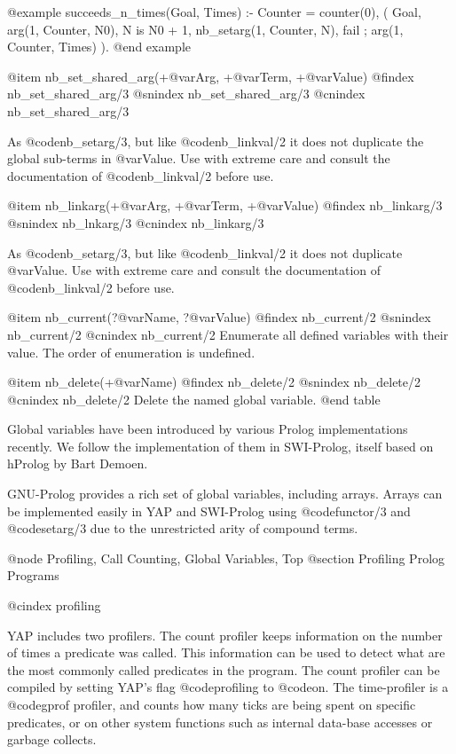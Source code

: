 {{{{{{{@example
    succeeds_n_times(Goal, Times) :-
            Counter = counter(0),
            (   Goal,
                arg(1, Counter, N0),
                N is N0 + 1,
                nb_setarg(1, Counter, N),
                fail
            ;   arg(1, Counter, Times)
            ).
@end example

@item nb_set_shared_arg(+@var{Arg}, +@var{Term}, +@var{Value}) 
@findex nb_set_shared_arg/3
@snindex nb_set_shared_arg/3
@cnindex nb_set_shared_arg/3

As @code{nb_setarg/3}, but like @code{nb_linkval/2} it does not
duplicate the global sub-terms in @var{Value}. Use with extreme care
and consult the documentation of @code{nb_linkval/2} before use.

@item nb_linkarg(+@var{Arg}, +@var{Term}, +@var{Value}) 
@findex nb_linkarg/3
@snindex nb_lnkarg/3
@cnindex nb_linkarg/3

As @code{nb_setarg/3}, but like @code{nb_linkval/2} it does not
duplicate @var{Value}. Use with extreme care and consult the
documentation of @code{nb_linkval/2} before use.


@item nb_current(?@var{Name}, ?@var{Value}) 
@findex nb_current/2
@snindex nb_current/2
@cnindex nb_current/2
Enumerate all defined variables with their value. The order of
enumeration is undefined. 

@item nb_delete(+@var{Name}) 
@findex nb_delete/2
@snindex nb_delete/2
@cnindex nb_delete/2
Delete the named global variable. 
@end table

Global variables have been introduced by various Prolog
implementations recently. We follow the implementation of them in
SWI-Prolog, itself based on hProlog by Bart Demoen.

GNU-Prolog provides a rich set of global variables, including
arrays. Arrays can be implemented easily in YAP and SWI-Prolog using
@code{functor/3} and @code{setarg/3} due to the unrestricted arity of
compound terms.


@node Profiling, Call Counting, Global Variables, Top
@section Profiling Prolog Programs

@cindex profiling

YAP includes two profilers. The count profiler keeps information on the
number of times a predicate was called. This information can be used to
detect what are the most commonly called predicates in the program.  The
count profiler can be compiled by setting YAP's flag @code{profiling}
to @code{on}. The time-profiler is a @code{gprof} profiler, and counts
how many ticks are being spent on specific predicates, or on other
system functions such as internal data-base accesses or garbage collects.

}}}}}}}
